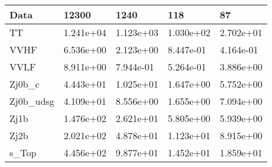 \begin{table}
{\begin{tabularx}{\textwidth}{|X|X|X|X|X|}
\hline
Data & 12300 & 1240 & 118 & 87 \\
\hline
TT & 1.241e+04 & 1.123e+03 & 1.030e+02 & 2.702e+01 \\
VVHF & 6.536e+00 & 2.123e+00 & 8.447e-01 & 4.164e-01 \\
VVLF & 8.911e+00 & 7.944e-01 & 5.264e-01 & 3.886e+00 \\
Zj0b\_c & 4.443e+01 & 1.025e+01 & 1.647e+00 & 5.752e+00 \\
Zj0b\_udsg & 4.109e+01 & 8.556e+00 & 1.655e+00 & 7.094e+00 \\
Zj1b & 1.476e+02 & 2.621e+01 & 5.805e+00 & 5.939e+00 \\
Zj2b & 2.021e+02 & 4.878e+01 & 1.123e+01 & 8.915e+00 \\
s\_Top & 4.456e+02 & 9.877e+01 & 1.452e+01 & 1.859e+01 \\
\hline
\end{tabularx}
}
\label{tab:cr-Zee-2017}
\end{table}

